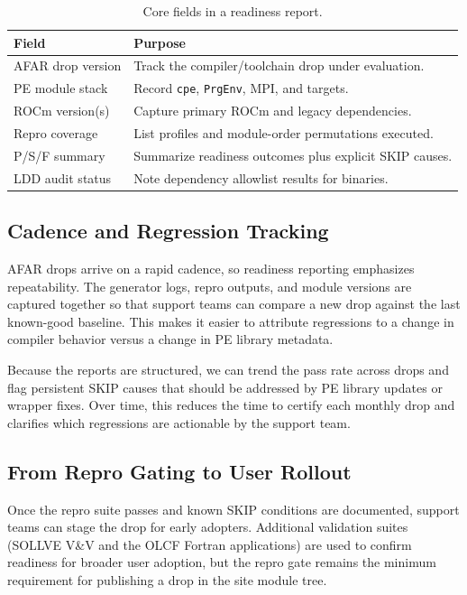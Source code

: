 \begin{table}[t]
  \centering
  \small
  \setlength{\tabcolsep}{4pt}
  \caption{Core fields in a readiness report.}
  \label{tab:report-fields}
  \begin{tabular}{l p{}}
    \hline
    Field & Purpose \\
    \hline
    AFAR drop version & Track the compiler/toolchain drop under evaluation. \\
    PE module stack & Record \texttt{cpe}, \texttt{PrgEnv}, MPI, and targets. \\
    ROCm version(s) & Capture primary ROCm and legacy dependencies. \\
    Repro coverage & List profiles and module-order permutations executed. \\
    P/S/F summary & Summarize readiness outcomes plus explicit SKIP causes. \\
    LDD audit status & Note dependency allowlist results for binaries. \\
    \hline
  \end{tabular}
\end{table}

\subsection{Cadence and Regression Tracking}
\label{sec:cadence}
AFAR drops arrive on a rapid cadence, so readiness reporting emphasizes
repeatability. The generator logs, repro outputs, and module versions are
captured together so that support teams can compare a new drop against the last
known-good baseline. This makes it easier to attribute regressions to a change
in compiler behavior versus a change in PE library metadata.

Because the reports are structured, we can trend the pass rate across drops
and flag persistent SKIP causes that should be addressed by PE library updates
or wrapper fixes. Over time, this reduces the time to certify each monthly
drop and clarifies which regressions are actionable by the support team.

\subsection{From Repro Gating to User Rollout}
\label{sec:rollout}
Once the repro suite passes and known SKIP conditions are documented, support
teams can stage the drop for early adopters. Additional validation suites
(SOLLVE V\&V and the OLCF Fortran applications) are used to confirm readiness
for broader user adoption, but the repro gate remains the minimum requirement
for publishing a drop in the site module tree.
